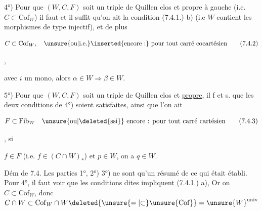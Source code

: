 

4°) Pour que $(W,C,F)$ soit un triple de Quillen clos et propre à gauche (i.e. $C\subset\mathrm{Cof}_W$) il faut et il suffit qu'on ait la condition (7.4.1.) b) (i.e $W$ contient les morphismes de type injectif), et de plus

\[
C\subset\mathrm{Cof}_W,\quad \unsure{\text{ou}|\text{i.e.}}\inserted{\text{encore :}}\ \text{pour tout carré cocartésien}\tag*{(7.4.2)}
\]

,

avec $i$ un mono, alors $\alpha\in W\Longrightarrow\beta\in W$.

5°) Pour que $(W,C,F)$ soit un triple de Quillen clos et \uline{propre}, il f et s. que les deux conditions de 4°) soient satisfaites, ainsi que l'on ait

\[
F\subset\mathrm{Fib}_W\quad\unsure{\text{ou}|\text{\deleted{ssi}}}\ \text{encore : pour tout carré cartésien}\tag*{(7.4.3)}
\]

, si

$f\in F$ (i.e. $f\in(C\cap W)_*$) et $p\in W$, on a $q\in W$.

Dém de 7.4. Les parties 1°, 2°) 3°) ne sont qu'un résumé de ce qui était établi. Pour 4°, il faut voir que les conditions dites impliquent (7.4.1.) a), Or on  $C\subset\mathrm{Cof}_W$, donc $C\cap W\subset\mathrm{Cof}_W\cap W\deleted{\unsure{=|{\subset}}\unsure{\mathrm{Cof}}}=\unsure{W}^{\mathrm{univ}}$ 
